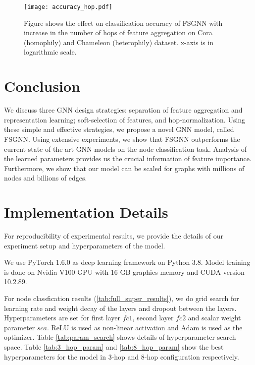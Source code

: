 \documentclass[sigconf,natbib=false]{acmart}
\begin{document}
\begin{figure}[h]
    \centering
    \texttt{[image: accuracy\_hop.pdf]}
    \caption{Figure shows the effect on classification accuracy of FSGNN with increase in the number of hops of feature aggregation on Cora (homophily) and Chameleon (heterophily) dataset. x-axis is in logarithmic scale. }
    \label{fig:accuracy_hop}
\end{figure}



\section{Conclusion}
\label{conclusion}

We discuss three GNN design strategies: separation of feature aggregation and representation learning; soft-selection of features, and hop-normalization. Using these simple and effective strategies, we propose a novel GNN model, called FSGNN. Using extensive experiments, we show that FSGNN outperforms the current state of the art GNN models on the node classification task. Analysis of the learned parameters provides us the crucial information of feature importance. Furthermore, we show that our model can be scaled for graphs with millions of nodes and billions of edges.

\vspace{5mm}
\section*{Implementation Details}

For reproducibility of experimental results, we provide the details of our experiment setup and hyperparameters of the model. 

We use PyTorch 1.6.0 as deep learning framework on Python 3.8. Model training is done on Nvidia V100 GPU with 16 GB graphics memory and CUDA version 10.2.89.

For node classfication results (\ref{tab:full_super_results}), we do grid search for learning rate and weight decay of the layers and dropout between the layers. Hyperparameters are set for first layer $fc1$, second layer $fc2$ and scalar weight parameter $sca$. ReLU is used as non-linear activation and Adam is used as the optimizer. Table \ref{tab:param_search} shows details of hyperparameter search space. Table \ref{tab:3_hop_param} and \ref{tab:8_hop_param} show the best hyperparameters for the model in 3-hop and 8-hop configuration respectively.
\end{document}
